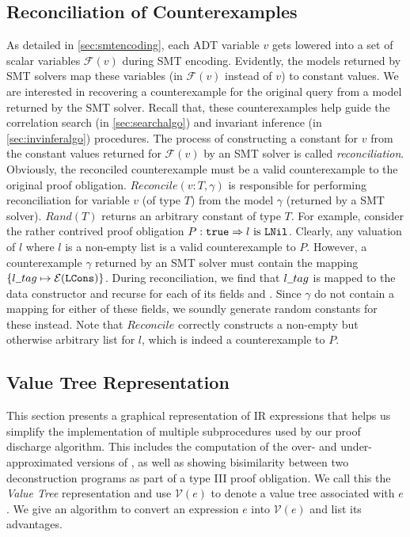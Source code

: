\subsection{Reconciliation of Counterexamples}
\label{sec:cerecons}
As detailed in \cref{sec:smtencoding}, each ADT variable $v$ gets lowered into a set of scalar
variables $\mathcal{F}(v)$ during SMT encoding.
Evidently, the models returned by SMT solvers map these variables (in $\mathcal{F}(v)$ instead of $v$)
to constant values.
We are interested in recovering a counterexample for the original query from a
model returned by the SMT solver.
Recall that, these counterexamples help guide the correlation search (in \cref{sec:searchalgo})
and invariant inference (in \cref{sec:invinferalgo}) procedures.
The process of constructing a constant for $v$ from the constant values returned for $\mathcal{F}(v)$
by an SMT solver is called {\em reconciliation}.
Obviously, the reconciled counterexample must be a valid counterexample to the original proof obligation.
$Reconcile(v:T, \gamma)$ is responsible for performing reconciliation for variable $v$ (of type $T$)
from the model $\gamma$ (returned by a SMT solver).
$Rand(T)$ returns an arbitrary constant of type $T$.
For example, consider the rather contrived proof obligation $P: {\tt true} \Rightarrow l\ \mathrm{is}\ {\tt {\tt LNil}}$.
Clearly, any valuation of $l$ where $l$ is a non-empty list is a valid counterexample to $P$.
However, a counterexample $\gamma$ returned by an SMT solver must contain
the mapping $\{ l \strsep{} tag \mapsto \mathcal{E}(\cons{LCons}) \}$.
During reconciliation, we find that $l \strsep{} tag$ is mapped to the data constructor 
and recurse for each of its fields  and .
Since $\gamma$ do not contain a mapping for either of these fields, we soundly generate random constants
for these instead.
Note that $Reconcile$ correctly constructs a non-empty but otherwise arbitrary list for $l$, which
is indeed a counterexample to $P$.



\subsection{Value Tree Representation}
\label{sec:valuegraph}
This section presents a graphical representation of IR expressions that helps us simplify the
implementation of multiple subprocedures used by our proof discharge algorithm.
This includes the computation of the over- and under-approximated versions of \recursiveRelations{},
as well as showing bisimilarity between two deconstruction programs as part of a type III proof obligation.
We call this the {\em Value Tree} representation and use $\mathcal{V}(e)$ to denote a value tree associated with $e$.
We give an algorithm to convert an expression $e$ into $\mathcal{V}(e)$ and list its advantages.

